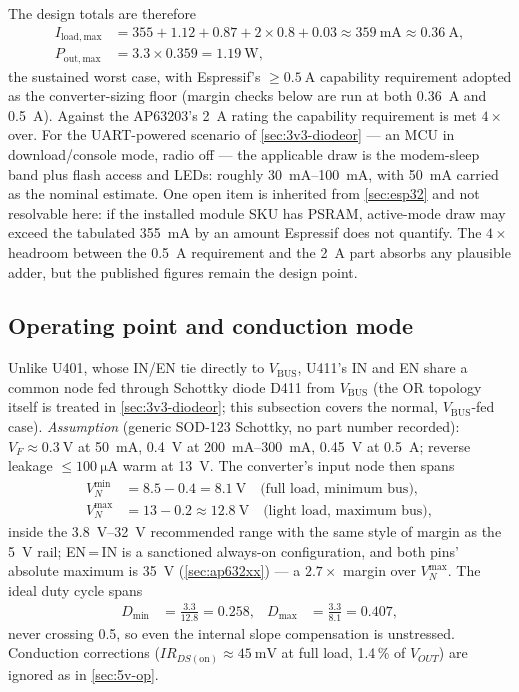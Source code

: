 The design totals are therefore
\begin{align*}
  I_{\mathrm{load,max}} &= 355 + 1.12 + 0.87 + 2\times0.8 + 0.03
    \approx \SI{359}{\milli\ampere} \approx \SI{0.36}{\ampere},\\
  P_{\mathrm{out,max}} &= 3.3 \times 0.359 = \SI{1.19}{\watt},
\end{align*}
the sustained worst case, with Espressif's $\geq\SI{0.5}{\ampere}$ capability requirement adopted as the
converter-sizing floor (margin checks below are run at both \SI{0.36}{\ampere} and
\SI{0.5}{\ampere}). Against the AP63203's \SI{2}{\ampere} rating the capability
requirement is met $4\times$ over. For the UART-powered scenario of
\cref{sec:3v3-diodeor} --- an MCU in download/console mode, radio off --- the applicable
draw is the modem-sleep band plus flash access and LEDs: roughly
\SIrange{30}{100}{\milli\ampere}, with \SI{50}{\milli\ampere} carried as the nominal
estimate. One open item is inherited from \cref{sec:esp32} and not resolvable here:
if the installed module SKU has PSRAM, active-mode draw may exceed the tabulated
\SI{355}{\milli\ampere} by an amount Espressif does not quantify. The $4\times$ headroom
between the \SI{0.5}{\ampere} requirement and the \SI{2}{\ampere} part absorbs any
plausible adder, but the published figures remain the design point.

\subsection{Operating point and conduction mode}\label{sec:3v3-op}

Unlike U401, whose IN/EN tie directly to $V_{\mathrm{BUS}}$, U411's IN and EN share a
common node fed through Schottky diode D411 from $V_{\mathrm{BUS}}$ (the OR topology
itself is treated in \cref{sec:3v3-diodeor}; this subsection covers the normal,
$V_{\mathrm{BUS}}$-fed case). \emph{Assumption} (generic SOD-123 Schottky, no part
number recorded): $V_F \approx \SI{0.3}{\volt}$ at \SI{50}{\milli\ampere},
\SI{0.4}{\volt} at \SIrange{200}{300}{\milli\ampere}, \SI{0.45}{\volt} at
\SI{0.5}{\ampere}; reverse leakage $\leq\SI{100}{\micro\ampere}$ warm at \SI{13}{\volt}.
The converter's input node then spans
\begin{align*}
  V_N^{\min} &= 8.5 - 0.4 = \SI{8.1}{\volt} \quad\text{(full load, minimum bus)}, \\
  V_N^{\max} &= 13 - 0.2 \approx \SI{12.8}{\volt} \quad\text{(light load, maximum bus)},
\end{align*}
inside the \SIrange{3.8}{32}{\volt} recommended range with the same style of margin as
the 5~V rail; EN\,=\,IN is a sanctioned always-on configuration, and both pins' absolute
maximum is \SI{35}{\volt} (\cref{sec:ap632xx}) --- a $2.7\times$ margin over
$V_N^{\max}$. The ideal duty cycle spans
\begin{align*}
  D_{\min} &= \frac{3.3}{12.8} = 0.258, &
  D_{\max} &= \frac{3.3}{8.1} = 0.407,
\end{align*}
never crossing 0.5, so even the internal slope compensation is unstressed. Conduction
corrections ($I R_{DS(\mathrm{on})} \approx \SI{45}{\milli\volt}$ at full load, 1.4\,\%
of $V_{OUT}$) are ignored as in \cref{sec:5v-op}.

